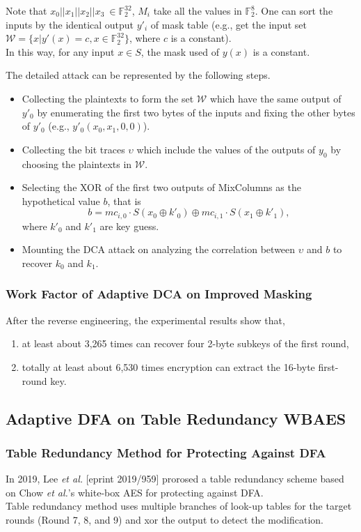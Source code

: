 \documentclass{beamer}
\begin{document}
\frame
{
	Note that $x_0||x_1||x_2||x_3\ \in \mathbb{F}_{2}^{32}$, $M_i$ take all the values in $\mathbb{F}_{2}^{8}$. One can sort the inputs by the identical output $y'_i$ of mask table (e.g., get the input set $\mathcal{W}=\{x|y'(x)=c,x\in\mathbb{F}_{2}^{32}\}$, where $c$ is a constant).
	\\[2ex]
	In this way, for any input $x\in S$, the mask used of $y(x)$ is a constant.
	
}

\frame
{
	The detailed attack can be represented by the following steps.
	\begin{itemize}	
		\item Collecting the plaintexts to form the set $\mathcal{W}$ which have the same output of $y'_0$ by enumerating the first two bytes of the inputs and fixing the other bytes of $y'_0$ (e.g., $y'_0(x_0,x_1,0,0)$).
		\item Collecting the bit traces $\upsilon$ which include the values of the outputs of $y_0$ by choosing the plaintexts in $\mathcal{W}$.
	\end{itemize}
}

\frame
{
	\begin{itemize}
		\item Selecting the XOR of the first two outputs of MixColumns as the hypothetical value $b$, that is
		\begin{displaymath}
		b=mc_{i,0}\cdot S(x_0\oplus k'_0)\oplus mc_{i,1}\cdot S(x_1\oplus k'_1),
		\end{displaymath}
		where $k'_0$ and $k'_1$ are key guess.
		\item Mounting the DCA attack on analyzing the correlation between $\upsilon$ and $b$ to recover $k_0$ and $k_1$.
	\end{itemize}
}

\frame
{ 
	\frametitle{Work Factor of Adaptive DCA on Improved Masking}
	After the reverse engineering, the experimental results show that, 
	\begin{enumerate}[1.]
		\item at least about 3,265 times can recover four 2-byte subkeys of the first round,
		\item totally at least about 6,530 times encryption can extract the 16-byte first-round key.
	\end{enumerate}
}

\subsection{Adaptive DFA on Table Redundancy WBAES}
\frame
{
	\frametitle{Table Redundancy Method for Protecting Against DFA}
	In 2019, Lee \textit{et al.} [eprint 2019/959] prorosed a table redundancy scheme based on Chow \textit{et al.}'s white-box AES for protecting against DFA.
	\\[2ex]
	Table redundancy method uses multiple branches of look-up tables for the target rounds (Round 7, 8, and 9) and xor the output to detect the modification.
}
\end{document}
